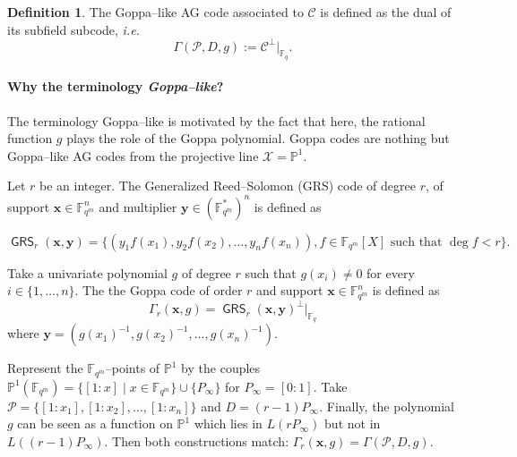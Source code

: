 \documentclass[a4paper]{article}
\theoremstyle{definition}
\newtheorem{definition}[thm]{Definition}
\theoremstyle{remark}
\newcommand{\calP}{\mathcal{P}}
\newcommand{\calC}{\mathcal{C}}
\newcommand{\calX}{\mathcal{X}}
\newcommand{\fqm}{\mathbb{F}_{q^m}}
\newcommand{\fq}{\mathbb{F}_{q}}
\newcommand{\PP}{\mathbb{P}}
\newcommand{\GRS}{\operatorname{\mathsf{GRS}}}
\begin{document}
\begin{definition} \label{def:Goppa--like_AG_code}
The Goppa--like AG code associated to $\calC$ is defined as the dual of its subfield subcode, \emph{i.e.}
$$ \Gamma(\calP,D,g) := \calC^{\perp}|_{\fq}.$$
\end{definition}

\paragraph{Why the terminology \textit{Goppa--like}?} The terminology Goppa--like is motivated by the fact that here, the rational function $g$ plays the role of the Goppa polynomial. Goppa codes are nothing but Goppa--like AG codes from the projective line $\calX=\PP^1$.

Let $r$ be an integer. The Generalized Reed--Solomon (GRS) code of degree $r$, of support $\mathbf{x} \in \fqm^n$ and multiplier $\mathbf{y} \in (\fqm^*)^n$ is defined as

\[\GRS_r(\mathbf{x},\mathbf{y})=\{(y_1f(x_1),y_2f(x_2),\dots,y_nf(x_n)), f \in \fqm[X] \text{ such that } \deg f < r \}.\]

Take a univariate polynomial $g$ of degree $r$ such that $g(x_i) \neq 0$ for every  $i \in \{1,\dots,n\}$. The the Goppa code of order $r$ and support $\mathbf{x} \in \fqm^n$ is defined as
\[\Gamma_r(\mathbf{x},g)= \GRS_r(\mathbf{x},\mathbf{y})^\perp|_{\fq}\]
where $\mathbf{y}=(g(x_1)^{-1},g(x_2)^{-1},\dots,g(x_n)^{-1})$.

Represent the $\fqm$--points of $\PP^1$ by the couples $\PP^1(\fqm)=\{[1:x] \mid x \in \fqm\} \cup \{P_\infty\}$ for $P_\infty=[0:1]$. Take $\calP=\{[1:x_1],[1:x_2],\dots,[1:x_n]\}$ and $D=(r-1)P_\infty$. Finally, the polynomial $g$ can be seen as a function on $\PP^1$ which lies in $L(rP_\infty)$ but not in $L((r-1)P_\infty)$. Then both constructions match: $\Gamma_r(\mathbf{x},g)=\Gamma(\calP,D,g)$.
\end{document}
